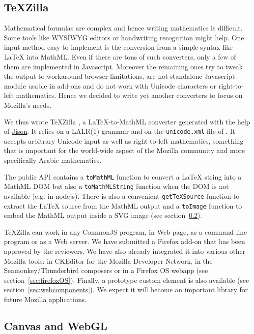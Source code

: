 \subsection{TeXZilla}

Mathematical formulas are complex and hence writing mathematics is difficult.
Some tools like WYSIWYG editors or handwriting recognition might help. One
input method easy to implement is the conversion from a simple syntax like
LaTeX into MathML. Even if there are tons of such converters, only a few of
them are implemented in Javascript. Moreover
the remaining ones try to tweak the output
to workaround browser limitations, are not standalone Javascript module usable
in add-ons and do not work with Unicode characters or right-to-left
mathematics. Hence we decided to write yet another converters to focus on
Mozilla's needs.

We thus wrote TeXZilla \cite{TeXZilla},
a LaTeX-to-MathML converter generated with the help of
\href{http://zaach.github.io/jison/docs/}{Jison}.
It relies on a LALR(1) grammar and on the {\tt unicode.xml} file of
\cite{XMLEntityDefinition}. It accepts arbitrary
Unicode input as well as right-to-left mathematics, something that is important
for the world-wide aspect of the Mozilla community and more specifically
Arabic mathematics.

The public API contains a {\tt toMathML} function to convert a LaTeX string
into a MathML DOM but also a {\tt toMathMLString} function when the DOM is
not available (e.g. in nodejs). There is also a convenient {\tt getTeXSource}
function to extract the LaTeX source from the MathML output and a
{\tt toImage} function to embed the MathML output inside a SVG image
(see section~\ref{sec:canvas}).

TeXZilla can work in any CommonJS program, in Web page, as a command line
program or as a Web server. We have submitted a Firefox add-on
that has been approved by the reviewers. We have also already integrated it into
various other Mozilla tools: in CKEditor for the Mozilla Developer Network,
in the Seamonkey/Thunderbird composers or in a Firefox OS webapp
(see section~\ref{sec:firefoxOS}).
Finally, a prototype {\tt <x-tex>} custom element is also available
(see section~\ref{sec:webcomponents}).
We expect it will become an important library for future Mozilla applications.

\subsection{Canvas and WebGL}
\label{sec:canvas}


